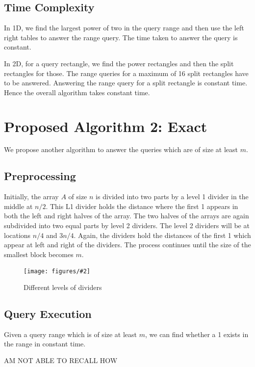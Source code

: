 \documentclass{article}
\newcommand{\addpicture}[4]
{ \begin{figure}[H] \centering \texttt{[image: figures/\#2]} \caption{#4} \label{#3}  \end{figure} }
\begin{document}
\subsection{Time Complexity}
In 1D, we find the largest power of two in the query range and then use the left right tables to answer the range query. The time taken to answer the query is constant.

In 2D, for a query rectangle, we find the power rectangles and then the split rectangles for those. The range queries for a maximum of 16 split rectangles have to be answered. Answering the range query for a split rectangle is constant time. Hence the overall algorithm takes constant time.

\section{Proposed Algorithm 2: Exact}
We propose another algorithm to answer the queries which are of size at least $m$. 

\subsection{Preprocessing}
Initially, the array $A$ of size $n$ is divided into two parts by a level 1 divider in the middle at $n/2$. This L1 divider holds the distance where the first 1 appears in both the left and right halves of the array. The two halves of the arrays are again subdivided into two equal parts by level 2 dividers. The level 2 dividers will be at locations $n/4$ and $3n/4$. Again, the dividers hold the distances of the first 1 which appear at left and right of the dividers. The process continues until the size of the smallest block becomes $m$.
\addpicture{width=2.8in}{levels.png}{dividers}{Different levels of dividers}

\subsection{Query Execution}
Given a query range which is of size at least $m$, we can find whether a 1 exists in the range in constant time. 

AM NOT ABLE TO RECALL HOW
\end{document}
